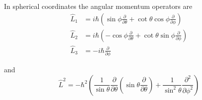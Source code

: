In spherical coordinates the angular momentum operators are
\begin{align*}
\hat L_1&=i\hbar\left(\sin\phi\frac{\partial}{\partial\theta}
+\cot\theta\cos\phi\frac{\partial}{\partial\phi}\right)
\\
\hat L_2&=i\hbar\left(-\cos\phi\frac{\partial}{\partial\theta}
+\cot\theta\sin\phi\frac{\partial}{\partial\phi}\right)
\\
\hat L_3&=-i\hbar\frac{\partial}{\partial\phi}
\end{align*}

and
\begin{equation*}
\hat L^2=-\hbar^2\left(\frac{1}{\sin\theta}\frac{\partial}{\partial\theta}
\left(\sin\theta\frac{\partial}{\partial\theta}\right)
+\frac{1}{\sin^2\theta}\frac{\partial^2}{\partial\phi^2}\right)
\end{equation*}


